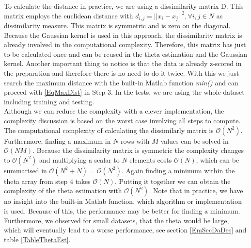 \FloatBarrier
To calculate the distance in practice, we are using a dissimilarity matrix D.
This matrix employs the euclidean distance with $d_{i,j}=||x_i-x_j||^2, \forall i,j \in N$ as dissimilarity measure.
This matrix is symmetric and is zero on the diagonal.\cite[p. 22,299]{Gentle.2007}\newline
Because the Gaussian kernel is used in this approach, the dissimilarity matrix is already involved in the computational complexity.
Therefore, this matrix has just to be calculated once and can be reused in the theta estimation and the Gaussian kernel.
Another important thing to notice is that the data is already z-scored in the preparation and therefore there is no need to do it twice.
With this we just search the maximum distance with the built-in Matlab function \textit{min()} and can proceed with \eqref{EqMaxDist} in Step 3.
In the tests, we are using the whole dataset including training and testing.\\
Although we can reduce the complexity with a clever implementation, the complexity discussion is based on the worst case involving all steps to compute.
The computational complexity of calculating the dissimilarly matrix is $\mathcal{O}(N^2)$.\cite{Kobti.2007}
Furthermore, finding a maximum in $N$ rows with $M$ values can be solved in $\mathcal{O}(NM)$.
Because the dissimilarity matrix is symmetric the complexity changes to $\mathcal{O}(N^2)$ and multiplying a scalar to $N$ elements costs $\mathcal{O}(N)$, which can be summarised in $\mathcal{O}(N^2+N)=\mathcal{O}(N^2)$.
Again finding a minimum within the theta array from step 4 takes $\mathcal{O}(N)$.
Putting it together we can obtain the complexity of the theta estimation with $\mathcal{O}(N^2)$.
Note that in practice, we have no insight into the built-in Matlab function, which algorithm or implementation is used.
Because of this, the performance may be better for finding a minimum.
Furthermore, we observed for small datasets, that the theta would be large, which will eventually lead to a worse performance, see section \ref{EmSecDaDes} and table \ref{TableThetaEst}.
